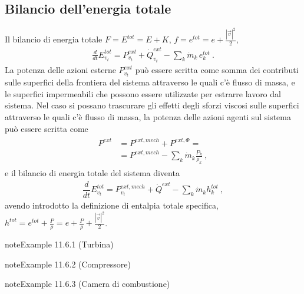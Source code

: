 \documentclass[letterpaper,10pt,italian]{jupyterBook}
\begin{document}
\subsection{Bilancio dell’energia totale}
\label{\detokenize{ch/thermodynamics/principles-open:bilancio-dell-energia-totale}}
\sphinxAtStartPar
Il bilancio di energia totale \(F = E^{tot} = E + K\), \(f = e^{tot} = e + \frac{|\vec{v}|^2}{2}\),
\begin{equation*}
\begin{split}\frac{d}{dt} E^{tot}_{v_t} = P^{ext}_{v_t}  + \dot{Q}^{ext}_{v_t}  - \sum_k \dot{m}_k \, e^{tot}_k \ .\end{split}
\end{equation*}
\sphinxAtStartPar
La potenza delle azioni esterne \(P^{ext}_{v_t}\) può essere scritta come somma dei contributi sulle superfici della frontiera del sistema attraverso le quali c’è flusso di massa, e le superfici impermeabili che possono essere utilizzate per estrarre lavoro dal sistema. Nel caso si possano trascurare gli effetti degli sforzi viscosi sulle superfici attraverso le quali c’è flusso di massa, la potenza delle azioni agenti sul sistema può essere scritta come
\begin{equation*}
\begin{split}\begin{aligned}
  P^{ext} & = P^{ext,mech} + P^{ext,\Phi} = \\
          & = P^{ext,mech} - \sum_{k} \dot{m}_k \frac{P_k}{\rho_k} \ , 
\end{aligned}\end{split}
\end{equation*}
\sphinxAtStartPar
e il bilancio di energia totale del sistema diventa
\begin{equation*}
\begin{split}\dfrac{d}{dt} E^{tot}_{v_t} = P^{ext,mech}_{v_t} + \dot{Q}^{ext} - \sum_k \dot{m}_k h^{tot}_k \ ,\end{split}
\end{equation*}
\sphinxAtStartPar
avendo introdotto la definizione di entalpia totale specifica, \(h^{tot} = e^{tot} + \frac{P}{\rho} = e + \frac{P}{\rho} + \frac{|\vec{v}|^2}{2}\).
\label{ch/thermodynamics/principles-open:example-0}
\begin{sphinxadmonition}{note}{Example 11.6.1 (Turbina)}


\end{sphinxadmonition}
\label{ch/thermodynamics/principles-open:example-1}
\begin{sphinxadmonition}{note}{Example 11.6.2 (Compressore)}


\end{sphinxadmonition}
\label{ch/thermodynamics/principles-open:example-2}
\begin{sphinxadmonition}{note}{Example 11.6.3 (Camera di combustione)}


\end{sphinxadmonition}
\end{document}
